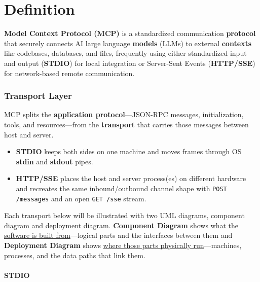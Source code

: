\newpage
\part{Definition}
\textbf{Model Context Protocol (MCP)} is a standardized communication \textbf{protocol}
that securely connects AI large language \textbf{models} (LLMs) to external
\textbf{contexts} like codebases, databases, and files, frequently using either
standardized input and output (\textbf{STDIO}) for local integration or
Server-Sent Events (\textbf{HTTP/SSE}) for network-based remote communication.












\section{Transport Layer}

MCP splits the \textbf{application protocol}---JSON-RPC messages, initialization, tools, and resources---from the \textbf{transport} that carries those messages between host and server.
\begin{itemize}
\item \textbf{STDIO} keeps both sides on one machine and moves frames through OS \textbf{stdin} and \textbf{stdout} pipes.
\item \textbf{HTTP/SSE} places the host and server process(es) on different hardware and recreates the same inbound/outbound channel shape with \texttt{POST /messages} and an open \texttt{GET /sse} stream.
\end{itemize}

Each transport below will be illustrated with two UML diagrams, component diagram and deployment diagram.
\textbf{Component Diagram} shows \uline{what the software is built from}---logical parts and the interfaces between them and 
\textbf{Deployment Diagram} shows \uline{where those parts physically run}---machines, processes, and the data paths that link them.











\newpage
\subsection{STDIO}

